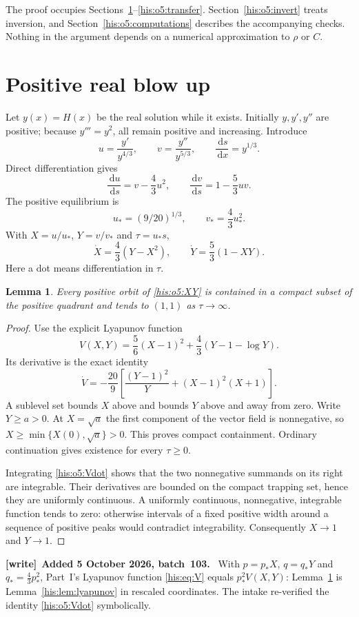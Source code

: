 \documentclass[11pt]{article}
\newtheorem{lemma}[theorem]{Lemma}
\theoremstyle{remark}\newtheorem{remark}[theorem]{Remark}
\newcommand{\dd}{\,\mathrm d}
\numberwithin{equation}{section}
\newenvironment{writenote}[1][]{\par\smallskip\begingroup\small
 \noindent\textbf{[write]}\if\relax\detokenize{#1}\relax\else~\textbf{#1.}\fi\ }%
 {\par\endgroup\smallskip}
\begin{document}
The proof occupies Sections~\ref{his:o5:real}--\ref{his:o5:transfer}.
Section~\ref{his:o5:invert} treats inversion, and Section~\ref{his:o5:computations}
describes the accompanying checks. Nothing in the argument depends on a
numerical approximation to $\rho$ or $C$.

\section{Positive real blow up}\label{his:o5:real}
Let $y(x)=H(x)$ be the real solution while it exists. Initially $y,y',y''$
are positive; because $y'''=y^2$, all remain positive and increasing.
Introduce
\[
u=\frac{y'}{y^{4/3}},\qquad v=\frac{y''}{y^{5/3}},
\qquad \frac{\dd s}{\dd x}=y^{1/3}.
\]
Direct differentiation gives
\begin{equation}\label{his:o5:uv}
\frac{\dd u}{\dd s}=v-\frac43u^2,\qquad
\frac{\dd v}{\dd s}=1-\frac53uv.
\end{equation}
The positive equilibrium is
\[
u_*=(9/20)^{1/3},\qquad v_*=\frac43u_*^2.
\]
With $X=u/u_*$, $Y=v/v_*$ and $\tau=u_*s$,
\begin{equation}\label{his:o5:XY}
\dot X=\frac43(Y-X^2),\qquad
\dot Y=\frac53(1-XY).
\end{equation}
Here a dot means differentiation in $\tau$.

\begin{lemma}\label{his:o5:lyap}
Every positive orbit of \eqref{his:o5:XY} is contained in a compact subset of the
positive quadrant and tends to $(1,1)$ as $\tau\to\infty$.
\end{lemma}
\begin{proof}
Use the explicit Lyapunov function
\[
V(X,Y)=\frac56(X-1)^2+\frac43(Y-1-\log Y).
\]
Its derivative is the exact identity
\begin{equation}\label{his:o5:Vdot}
\dot V=-\frac{20}{9}\left[
\frac{(Y-1)^2}{Y}+(X-1)^2(X+1)\right].
\end{equation}
A sublevel set bounds $X$ above and bounds $Y$ above and away from zero.
Write $Y\ge a>0$. At $X=\sqrt a$ the first component of the vector field
is nonnegative, so
$X\ge\min\{X(0),\sqrt a\}>0$.
This proves compact containment. Ordinary continuation gives existence
for every $\tau\ge0$.

Integrating \eqref{his:o5:Vdot} shows that the two nonnegative summands on its
right are integrable. Their derivatives are bounded on the compact
trapping set, hence they are uniformly continuous. A uniformly continuous,
nonnegative, integrable function tends to zero: otherwise intervals of a
fixed positive width around a sequence of positive peaks would contradict
integrability. Consequently $X\to1$ and $Y\to1$.
\end{proof}
\begin{writenote}[Added 5 October 2026, batch~103]
With $p=p_*X$, $q=q_*Y$ and $q_*=\tfrac43p_*^2$, Part~I's Lyapunov function \eqref{his:eq:V} equals $p_*^2V(X,Y)$: Lemma~\ref{his:o5:lyap} is Lemma~\ref{his:lem:lyapunov} in rescaled coordinates. The intake re-verified the identity \eqref{his:o5:Vdot} symbolically.
\end{writenote}
\end{document}
